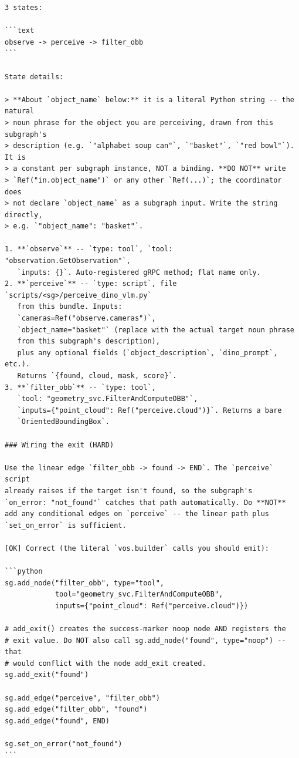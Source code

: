 \begin{lstlisting}
3 states:

```text
observe -> perceive -> filter_obb
```

State details:

> **About `object_name` below:** it is a literal Python string -- the natural
> noun phrase for the object you are perceiving, drawn from this subgraph's
> description (e.g. `"alphabet soup can"`, `"basket"`, `"red bowl"`). It is
> a constant per subgraph instance, NOT a binding. **DO NOT** write
> `Ref("in.object_name")` or any other `Ref(...)`; the coordinator does
> not declare `object_name` as a subgraph input. Write the string directly,
> e.g. `"object_name": "basket"`.

1. **`observe`** -- `type: tool`, `tool: "observation.GetObservation"`,
   `inputs: {}`. Auto-registered gRPC method; flat name only.
2. **`perceive`** -- `type: script`, file `scripts/<sg>/perceive_dino_vlm.py`
   from this bundle. Inputs:
   `cameras=Ref("observe.cameras")`,
   `object_name="basket"` (replace with the actual target noun phrase
   from this subgraph's description),
   plus any optional fields (`object_description`, `dino_prompt`, etc.).
   Returns `{found, cloud, mask, score}`.
3. **`filter_obb`** -- `type: tool`,
   `tool: "geometry_svc.FilterAndComputeOBB"`,
   `inputs={"point_cloud": Ref("perceive.cloud")}`. Returns a bare
   `OrientedBoundingBox`.

### Wiring the exit (HARD)

Use the linear edge `filter_obb -> found -> END`. The `perceive` script
already raises if the target isn't found, so the subgraph's
`on_error: "not_found"` catches that path automatically. Do **NOT**
add any conditional edges on `perceive` -- the linear path plus
`set_on_error` is sufficient.

[OK] Correct (the literal `vos.builder` calls you should emit):

```python
sg.add_node("filter_obb", type="tool",
            tool="geometry_svc.FilterAndComputeOBB",
            inputs={"point_cloud": Ref("perceive.cloud")})

# add_exit() creates the success-marker noop node AND registers the
# exit value. Do NOT also call sg.add_node("found", type="noop") -- that
# would conflict with the node add_exit created.
sg.add_exit("found")

sg.add_edge("perceive", "filter_obb")
sg.add_edge("filter_obb", "found")
sg.add_edge("found", END)

sg.set_on_error("not_found")
```


\end{lstlisting}
